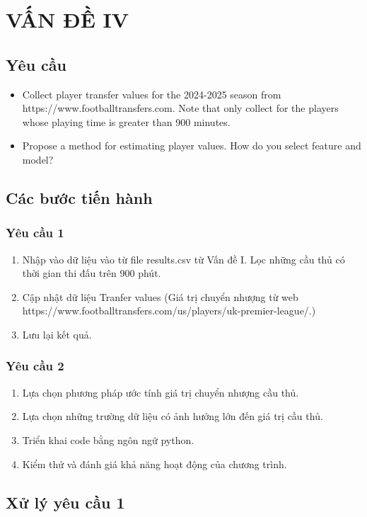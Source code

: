 \documentclass[12pt]{report}
\begin{document}
\chapter{VẤN ĐỀ IV}
{
\section{Yêu cầu}
\begin{itemize}
	\item Collect player transfer values for the 2024-2025 season from https://www.footballtransfers.com. Note that only collect for the players whose playing time is greater than 900 minutes.
	\item Propose a method for estimating player values. How do you select feature and model?
\end{itemize}
\section{Các bước tiến hành}
\subsection{Yêu cầu 1}
\begin{enumerate}
	\item Nhập vào dữ liệu vào từ file results.csv từ Vấn đề I. Lọc những cầu thủ có thời gian thi đấu trên 900 phút.
	\item Cập nhật dữ liệu Tranfer values (Giá trị chuyển nhượng từ web https://www.footballtransfers.com/us/players/uk-premier-league/.)
	\item Lưu lại kết quả.
\end{enumerate}
\subsection{Yêu cầu 2}
\begin{enumerate}
	\item Lựa chọn phương pháp ước tính giá trị chuyển nhượng cầu thủ.
	\item Lựa chọn những trường dữ liệu có ảnh hưởng lớn đến giá trị cầu thủ.
	\item Triển khai code bằng ngôn ngữ python.
	\item Kiểm thử và đánh giá khả năng hoạt động của chương trình.
\end{enumerate}
\section{Xử lý yêu cầu 1}
}
\end{document}
